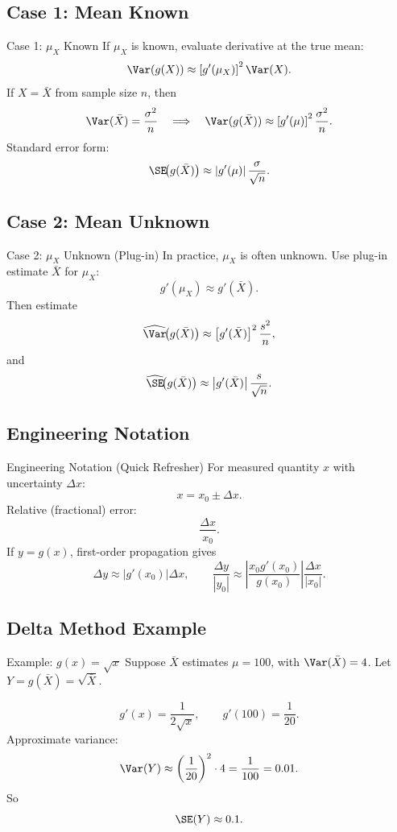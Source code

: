 \documentclass[aspectratio=169]{beamer}
\begin{document}
\subsection{Case 1: Mean Known}
\begin{frame}{Case 1: \(\mu_X\) Known}
  If \(\mu_X\) is known, evaluate derivative at the true mean:
  \[
    \Var(g(X))\approx \left[g'(\mu_X)\right]^2\Var(X).
  \]
  If \(X=\bar{X}\) from sample size \(n\), then
  \[
    \Var(\bar{X})=\frac{\sigma^2}{n}
    \quad\Longrightarrow\quad
    \Var(g(\bar{X}))\approx \left[g'(\mu)\right]^2\frac{\sigma^2}{n}.
  \]
  Standard error form:
  \[
    \SE\!\big(g(\bar{X})\big)\approx \left|g'(\mu)\right|\frac{\sigma}{\sqrt{n}}.
  \]
\end{frame}

\subsection{Case 2: Mean Unknown}
\begin{frame}{Case 2: \(\mu_X\) Unknown (Plug-in)}
  In practice, \(\mu_X\) is often unknown.
  Use plug-in estimate \(\bar{X}\) for \(\mu_X\):
  \[
    g'(\mu_X)\approx g'(\bar{X}).
  \]
  Then estimate
  \[
    \widehat{\Var}\!\big(g(\bar{X})\big)
    \approx
    \left[g'(\bar{X})\right]^2\frac{s^2}{n},
  \]
  and
  \[
    \widehat{\SE}\!\big(g(\bar{X})\big)
    \approx
    \left|g'(\bar{X})\right|\frac{s}{\sqrt{n}}.
  \]
\end{frame}

\subsection{Engineering Notation}
\begin{frame}{Engineering Notation (Quick Refresher)}
  For measured quantity \(x\) with uncertainty \(\Delta x\):
  \[
    x = x_0 \pm \Delta x.
  \]
  Relative (fractional) error:
  \[
    \frac{\Delta x}{x_0}.
  \]
  If \(y=g(x)\), first-order propagation gives
  \[
    \Delta y \approx \left|g'(x_0)\right|\Delta x,
    \qquad
    \frac{\Delta y}{|y_0|}
    \approx
    \left|\frac{x_0 g'(x_0)}{g(x_0)}\right|\frac{\Delta x}{|x_0|}.
  \]
\end{frame}

\subsection{Delta Method Example}
\begin{frame}{Example: \(g(x)=\sqrt{x}\)}
  Suppose \(\bar{X}\) estimates \(\mu=100\), with \(\Var(\bar{X})=4\).
  Let \(Y=g(\bar{X})=\sqrt{\bar{X}}\).

  \[
    g'(x)=\frac{1}{2\sqrt{x}},\qquad g'(100)=\frac{1}{20}.
  \]
  Approximate variance:
  \[
    \Var(Y)\approx \left(\frac{1}{20}\right)^2\cdot 4=\frac{1}{100}=0.01.
  \]
  So
  \[
    \SE(Y)\approx 0.1.
  \]
\end{frame}
\end{document}
